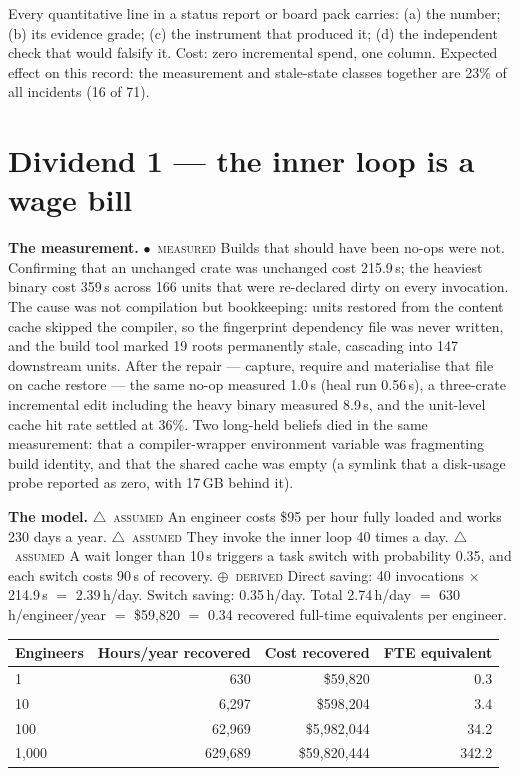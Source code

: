 \documentclass[11pt,a4paper]{article}
\newcommand{\stM}{\textcolor{sigilcyan}{$\bullet$}~{\scriptsize\textsc{measured}}}
\newcommand{\stD}{\textcolor{sigilviolet}{$\oplus$}~{\scriptsize\textsc{derived}}}
\newcommand{\stA}{\textcolor{sigilamber}{$\triangle$}~{\scriptsize\textsc{assumed}}}
\newcommand{\brief}[3]{\begin{tcolorbox}[colback=panelbg,colframe=#1,boxrule=0.8pt,arc=2pt,title=\textbf{#2},coltitle=white,colbacktitle=#1]#3\end{tcolorbox}}
\begin{document}
\brief{sigilviolet}{The one-page reporting standard}{Every quantitative line in a status report or board pack carries: (a) the number; (b) its evidence grade; (c) the instrument that produced it; (d) the independent check that would falsify it. Cost: zero incremental spend, one column. Expected effect on this record: the measurement and stale-state classes together are 23\% of all incidents (16 of 71).}


\section{Dividend 1 --- the inner loop is a wage bill}\label{sec:d1}


\textbf{The measurement.} \stM{} Builds that should have been no-ops were not. Confirming that an unchanged crate was unchanged cost 215.9\,s; the heaviest binary cost 359\,s across 166 units that were re-declared dirty on every invocation. The cause was not compilation but bookkeeping: units restored from the content cache skipped the compiler, so the fingerprint dependency file was never written, and the build tool marked 19 roots permanently stale, cascading into 147 downstream units. After the repair --- capture, require and materialise that file on cache restore --- the same no-op measured 1.0\,s (heal run 0.56\,s), a three-crate incremental edit including the heavy binary measured 8.9\,s, and the unit-level cache hit rate settled at 36\%. Two long-held beliefs died in the same measurement: that a compiler-wrapper environment variable was fragmenting build identity, and that the shared cache was empty (a symlink that a disk-usage probe reported as zero, with 17\,GB behind it).


\textbf{The model.} \stA{} An engineer costs \$95 per hour fully loaded and works 230 days a year. \stA{} They invoke the inner loop 40 times a day. \stA{} A wait longer than 10\,s triggers a task switch with probability 0.35, and each switch costs 90\,s of recovery. \stD{} Direct saving: 40 invocations $\times$ 214.9\,s $=$ 2.39\,h/day. Switch saving: 0.35\,h/day. Total 2.74\,h/day $=$ 630\,h/engineer/year $=$ \$59{,}820 $=$ 0.34 recovered full-time equivalents per engineer.


\begin{center}\small{}\begin{tabular}{lrrr}\toprule
Engineers & Hours/year recovered & Cost recovered & FTE equivalent \\\midrule
1 & 630 & \$59{,}820 & 0.3 \\
10 & 6{,}297 & \$598{,}204 & 3.4 \\
100 & 62{,}969 & \$5{,}982{,}044 & 34.2 \\
1{,}000 & 629{,}689 & \$59{,}820{,}444 & 342.2 \\
\bottomrule\end{tabular}\end{center}
\end{document}
